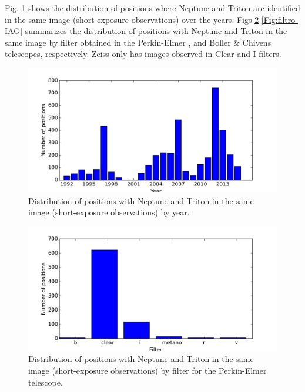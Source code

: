 \documentclass[12pt,a4paper]{report}
\newcommand{\PE}{Perkin-Elmer }
\newcommand{\BC}{Boller \& Chivens }
\begin{document}
Fig. \ref{Fig:pos-dist} shows the distribution of positions where Neptune and Triton are identified in the same image (short-exposure observations) over the years. Figs \ref{Fig:filtro-160}-\ref{Fig:filtro-IAG} summarizes the distribution of positions with Neptune and Triton in the same image by filter obtained in the \PE , and \BC telescopes, respectively. Zeiss only has images observed in Clear and I filters.

\begin{figure}
\includegraphics[width=16.0cm]{pos-distribution.png} 
\caption{Distribution of positions with Neptune and Triton in the same image (short-exposure observations) by year.}
\label{Fig:pos-dist}
\end{figure}



\begin{figure}[H]
\includegraphics[width=16.0cm]{filtro_160.png} 
\caption{Distribution of positions with Neptune and Triton in the same image (short-exposure observations) by filter for the \PE telescope.}
\label{Fig:filtro-160}
\end{figure}
\end{document}
